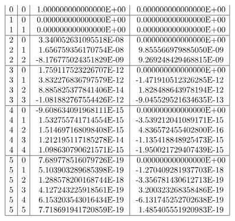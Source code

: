 \begin{description}
\begin{table}
\[\begin{array}{| c | c | c | c |}
\mbox{0} & \mbox{0} & \mbox{ 1.000000000000000E+00} & \mbox{ 0.000000000000000E+00}\\
\hline
\mbox{1} & \mbox{0} & \mbox{ 0.000000000000000E+00} & \mbox{ 0.000000000000000E+00}\\
\mbox{1} & \mbox{1} & \mbox{ 0.000000000000000E+00} & \mbox{ 0.000000000000000E+00}\\
\hline
\mbox{2} & \mbox{0} & \mbox{ 3.340052631095518E-08} & \mbox{ 0.000000000000000E+00}\\
\mbox{2} & \mbox{1} & \mbox{ 1.656759356170754E-08} & \mbox{ 9.855566979885050E-09}\\
\mbox{2} & \mbox{2} & \mbox{-8.176775024351829E-09} & \mbox{ 9.269248429468815E-09}\\
\hline
\mbox{3} & \mbox{0} & \mbox{ 1.759117523226707E-12} & \mbox{ 0.000000000000000E+00}\\
\mbox{3} & \mbox{1} & \mbox{ 3.832276836797579E-12} & \mbox{-1.471910512326285E-12}\\
\mbox{3} & \mbox{2} & \mbox{ 8.885825377841406E-14} & \mbox{ 1.828488643978194E-12}\\
\mbox{3} & \mbox{3} & \mbox{-1.081882767554426E-12} & \mbox{-9.045529521634635E-13}\\
\hline
\mbox{4} & \mbox{0} & \mbox{-9.608634091968111E-15} & \mbox{ 0.000000000000000E+00}\\
\mbox{4} & \mbox{1} & \mbox{ 1.532755741714554E-15} & \mbox{-3.539212041089171E-15}\\
\mbox{4} & \mbox{2} & \mbox{ 1.514697168098408E-15} & \mbox{ 4.836572455402800E-16}\\
\mbox{4} & \mbox{3} & \mbox{ 1.212195117185278E-14} & \mbox{-1.135418848925473E-15}\\
\mbox{4} & \mbox{4} & \mbox{ 1.098630790621571E-15} & \mbox{-1.950021729407439E-15}\\
\hline
\mbox{5} & \mbox{0} & \mbox{ 7.689778516079726E-19} & \mbox{ 0.000000000000000E+00}\\
\mbox{5} & \mbox{1} & \mbox{ 5.103903289685398E-19} & \mbox{-1.270409281937703E-18}\\
\mbox{5} & \mbox{2} & \mbox{ 1.288578200168744E-18} & \mbox{-3.356781430612713E-19}\\
\mbox{5} & \mbox{3} & \mbox{ 4.127243225918561E-19} & \mbox{ 3.200323268358486E-19}\\
\mbox{5} & \mbox{4} & \mbox{ 6.153203543016434E-19} & \mbox{-6.131745252702638E-19}\\
\mbox{5} & \mbox{5} & \mbox{ 7.718691941720859E-19} & \mbox{ 1.485405551920983E-19}\\
\hline
\end{array} \]
\end{table}


\end{description}
